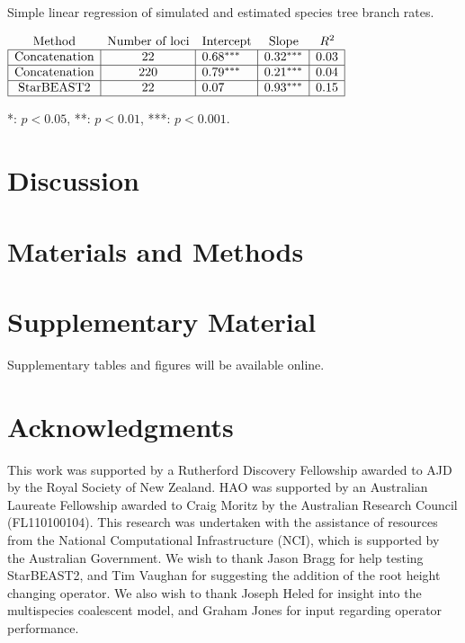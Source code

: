 \documentclass[12pt]{article}
\begin{document}
\begin{table}[htb!]
\centering
\caption{Simple linear regression of simulated and estimated species tree branch rates.}
\label{tab:branchRatesLM}
\begin{threeparttable}
\begin{adjustbox}{center}
\small
$\begin{array}{|c|c|l|l|l|}
\multicolumn{1}{c}{\text{Method}} & \multicolumn{1}{c}{\text{Number of loci}} & \multicolumn{1}{c}{\text{Intercept}} & \multicolumn{1}{c}{\text{Slope}} & \multicolumn{1}{c}{R^2}\tabularnewline
\hline
\text{Concatenation} & 22 & 0.68^{***} & 0.32^{***} & 0.03\tabularnewline
\hline
\text{Concatenation} & 220 & 0.79^{***} & 0.21^{***} & 0.04\tabularnewline
\hline
\text{StarBEAST2} & 22 & 0.07 & 0.93^{***} & 0.15\tabularnewline
\hline
\end{array}$
\end{adjustbox}
\begin{tablenotes}
\small
\item {*}: $p < 0.05$, {**}: $p < 0.01$, {***}: $p < 0.001$.
\end{tablenotes}
\end{threeparttable}
\end{table}

\clearpage

\section{Discussion}


\section{Materials and Methods}


\section{Supplementary Material}

Supplementary tables and figures will be available online.

\section{Acknowledgments}

This work was supported by a Rutherford Discovery Fellowship awarded to AJD by
the Royal Society of New Zealand. HAO was supported by an Australian Laureate
Fellowship awarded to Craig Moritz by the Australian Research Council
(FL110100104). This research was undertaken with the assistance of resources
from the National Computational Infrastructure (NCI), which is supported by the
Australian Government. We wish to thank Jason Bragg for help testing StarBEAST2,
and Tim Vaughan for suggesting the addition of the root height changing
operator. We also wish to thank Joseph Heled for insight into the multispecies
coalescent model, and Graham Jones for input regarding operator performance.



\end{document}
